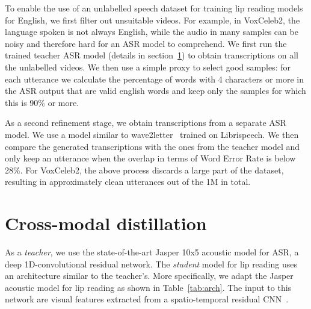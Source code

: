 \documentclass{article}
\def\psec{\vspace{-4pt}}
\begin{document}
To enable the use of an unlabelled speech dataset for training lip reading models for English, we first 
filter out unsuitable videos.
For example, in VoxCeleb2, the language spoken is not always English, while the
audio in many samples can be noisy and therefore hard for an ASR model to comprehend.
We first run the trained teacher ASR model (details in section~\ref{sec:method}) to obtain
transcriptions on all the unlabelled videos. 
We then use a simple proxy to select good samples: for each utterance we calculate the
percentage of words with 4 characters or more in the ASR output that are
valid english words and
keep only the samples for which this is 90\% or more.

As a second refinement stage, we obtain transcriptions from a separate ASR model. We use a
model similar to wave2letter~\cite{liptchinsky17} trained on Librispeech. We then compare the generated
transcriptions with the ones from the teacher model and only keep an utterance when the overlap
in terms of Word Error Rate is below 28\%.
For VoxCeleb2, the above process discards a large part of the dataset,
resulting in approximately  clean utterances out of the 1M in total. 


\psec\psec
\section{Cross-modal distillation} \label{sec:method} \psec



As a {\em teacher}, we use the state-of-the-art Jasper 10x5 acoustic model \cite{li2019jasper} for ASR, 
a deep 1D-convolutional residual network. 
The {\em student} model for lip reading uses an architecture similar to the teacher's.  
More specifically, we adapt the Jasper acoustic model for lip reading as shown in Table~\ref{tab:arch}.
The input to this network are visual features extracted from a
spatio-temporal residual CNN~\cite{Stafylakis17}.
\end{document}
